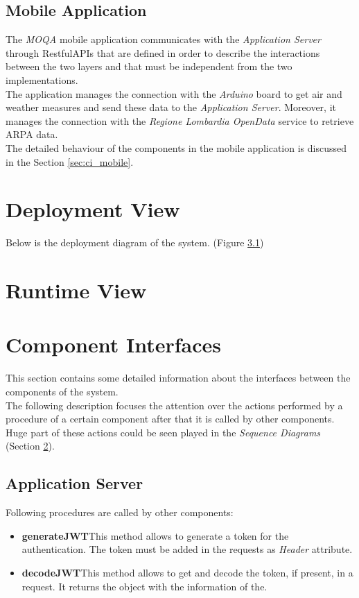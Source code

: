 \subsection{Mobile Application}
The \textit{MOQA} mobile application communicates with the \textit{Application Server} through RestfulAPIs that are defined in order to describe the interactions between the two layers and that must be independent from the two implementations.\\
The application manages the connection with the \textit{Arduino} board to get air and weather measures and send these data to the \textit{Application Server}. Moreover, it manages the connection with the \textit{Regione Lombardia OpenData} service to retrieve ARPA data.\\

The detailed behaviour of the components in the mobile application is discussed in the Section \ref{sec:ci_mobile}.

\section{Deployment View}
Below is the deployment diagram of the system. (Figure \ref{})

\section{Runtime View}\label{sec:runtime}

\section{Component Interfaces}
This section contains some detailed information about the interfaces between the components of the system.\\
The following description focuses the attention over the actions performed by a procedure of a certain component after that it is called by other components.\\
Huge part of these actions could be seen played in the \textit{Sequence Diagrams} (Section \ref{sec:runtime}).

\subsection{Application Server}

Following procedures are called by other components:
\begin{itemize}
    \item \textbf{generateJWT}\quad This method allows to generate a token for the authentication. The token must be added in the requests as \textit{Header} attribute.
    \item \textbf{decodeJWT}\quad This method allows to get and decode the token, if present, in a request. It returns the object with the information of the.
\end{itemize}

